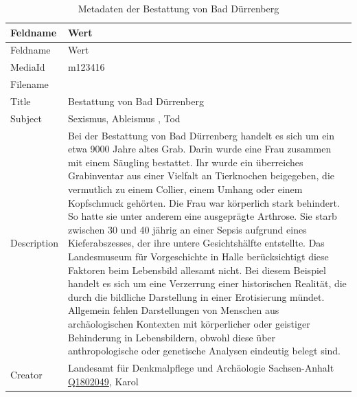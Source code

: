 \documentclass[
  letterpaper,
  DIV=11,
  numbers=noendperiod]{scrartcl}
\begin{document}
\begin{longtable}[]{@{}
  >{\raggedright\arraybackslash}p{}
  >{\raggedright\arraybackslash}p{}@{}}
\caption{Metadaten der Bestattung von Bad
Dürrenberg}\label{tbl-metadaten-bestattung-von-bad-duerrenberg}\tabularnewline
\toprule\noalign{}
\begin{minipage}[b]{\linewidth}\raggedright
Feldname
\end{minipage} & \begin{minipage}[b]{\linewidth}\raggedright
Wert
\end{minipage} \\
\midrule\noalign{}
\endfirsthead
\toprule\noalign{}
\begin{minipage}[b]{\linewidth}\raggedright
Feldname
\end{minipage} & \begin{minipage}[b]{\linewidth}\raggedright
Wert
\end{minipage} \\
\midrule\noalign{}
\endhead
\bottomrule\noalign{}
\endlastfoot
MediaId & m123416 \\
Filename & \\
Title & Bestattung von Bad Dürrenberg \\
Subject & Sexismus, Ableismus , Tod \\
Description & Bei der Bestattung von Bad Dürrenberg handelt es sich um
ein etwa 9000 Jahre altes Grab. Darin wurde eine Frau zusammen mit einem
Säugling bestattet. Ihr wurde ein überreiches Grabinventar aus einer
Vielfalt an Tierknochen beigegeben, die vermutlich zu einem Collier,
einem Umhang oder einem Kopfschmuck gehörten. Die Frau war körperlich
stark behindert. So hatte sie unter anderem eine ausgeprägte Arthrose.
Sie starb zwischen 30 und 40 jährig an einer Sepsis aufgrund eines
Kieferabszesses, der ihre untere Gesichtshälfte entstellte. Das
Landesmuseum für Vorgeschichte in Halle berücksichtigt diese Faktoren
beim Lebensbild allesamt nicht. Bei diesem Beispiel handelt es sich um
eine Verzerrung einer historischen Realität, die durch die bildliche
Darstellung in einer Erotisierung mündet. Allgemein fehlen Darstellungen
von Menschen aus archäologischen Kontexten mit körperlicher oder
geistiger Behinderung in Lebensbildern, obwohl diese über
anthropologische oder genetische Analysen eindeutig belegt sind. \\
Creator & Landesamt für Denkmalpflege und Archäologie Sachsen-Anhalt
\href{https://www.wikidata.org/wiki/Q1802049}{Q1802049}, Karol

\end{longtable}
\end{document}
